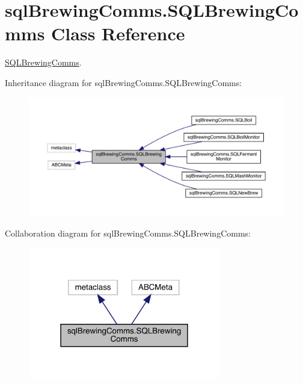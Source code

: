 \hypertarget{classsql_brewing_comms_1_1_s_q_l_brewing_comms}{}\section{sql\+Brewing\+Comms.\+S\+Q\+L\+Brewing\+Comms Class Reference}
\label{classsql_brewing_comms_1_1_s_q_l_brewing_comms}


\mbox{\hyperlink{classsql_brewing_comms_1_1_s_q_l_brewing_comms}{S\+Q\+L\+Brewing\+Comms}}.  




Inheritance diagram for sql\+Brewing\+Comms.\+S\+Q\+L\+Brewing\+Comms\+:\nopagebreak
\begin{figure}[H]
\begin{center}
\leavevmode
\includegraphics[width=350pt]{classsql_brewing_comms_1_1_s_q_l_brewing_comms__inherit__graph}
\end{center}
\end{figure}


Collaboration diagram for sql\+Brewing\+Comms.\+S\+Q\+L\+Brewing\+Comms\+:\nopagebreak
\begin{figure}[H]
\begin{center}
\leavevmode
\includegraphics[width=238pt]{classsql_brewing_comms_1_1_s_q_l_brewing_comms__coll__graph}
\end{center}
\end{figure}

